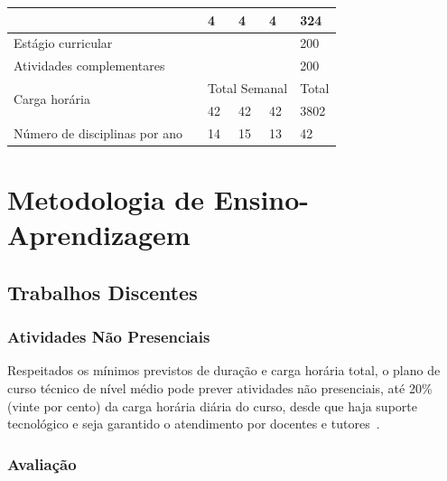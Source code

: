 \documentclass[11pt,fleqn]{book} %
\begin{document}
\begin{table}[H]
{\begin{tabular}{|l|l|l|l|l|l|}
			\multicolumn{2}{|l|}{\nameref{disc:estudo}}                                  & 4          & 4         & 4         & 324       \\ \hline
			\multicolumn{5}{|l|}{Estágio curricular}                                                                               & 200       \\ \hline
			\multicolumn{5}{|l|}{Atividades complementares}                                                                        & 200       \\ \hline
			\multicolumn{2}{|l|}{\multirow{2}{*}{Carga horária}}                              & \multicolumn{3}{l|}{Total Semanal} & Total     \\ \cline{3-6} 
			\multicolumn{2}{|l|}{}                                                            & 42         & 42        & 42        & 3802      \\ \hline
			Número de disciplinas por ano  &                                                  & 14         & 15        & 13        & 42        \\ \hline
		\end{tabular}%
	}
\end{table}

\section{Metodologia de Ensino-Aprendizagem}\label{metodologia}



\subsection{Trabalhos Discentes}\label{trabdiscentes}

\subsubsection{Atividades Não Presenciais}

Respeitados os mínimos previstos de duração e carga horária total, o plano de curso técnico de nível médio pode prever atividades não presenciais, até 20\% (vinte por cento) da carga horária diária do curso, desde que haja suporte tecnológico e seja garantido o atendimento por docentes e tutores~\cite{Resolucao06De2012}.

\subsubsection{Avaliação}
\end{document}
